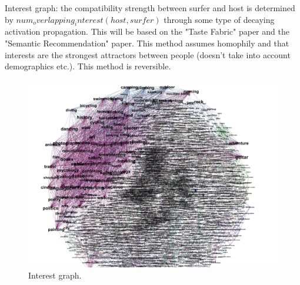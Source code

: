 Interest graph: the compatibility strength between surfer and host is determined by $num_overlapping_interest(host, surfer)$ through some type of decaying activation propagation.  This will be based on the "Taste Fabric" paper and the "Semantic Recommendation" paper.  This method assumes homophily and that interests are the strongest attractors between people (doesn't take into account demographics etc.).  This method is reversible.

\begin{figure}[ht]
\centering
\includegraphics[width=1\linewidth]{figures/interest_graph.png}
\caption{Interest graph.}
\label{fig:interest_graph}
\end{figure}
